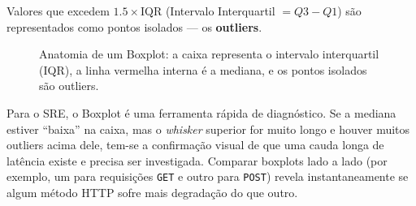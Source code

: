 \documentclass[12pt,a4paper,twoside]{report}
\begin{document}
Valores que excedem $1.5 \times \text{IQR}$ (Intervalo Interquartil $= Q3 - Q1$) são representados como pontos isolados --- os \textbf{outliers}.

\begin{figure}[h]
    \centering
    \caption{Anatomia de um Boxplot: a caixa representa o intervalo interquartil (IQR), a linha vermelha interna é a mediana, e os pontos isolados são outliers.}
\end{figure}

Para o SRE, o Boxplot é uma ferramenta rápida de diagnóstico. Se a mediana estiver ``baixa'' na caixa, mas o \textit{whisker} superior for muito longo e houver muitos outliers acima dele, tem-se a confirmação visual de que uma cauda longa de latência existe e precisa ser investigada. Comparar boxplots lado a lado (por exemplo, um para requisições \texttt{GET} e outro para \texttt{POST}) revela instantaneamente se algum método HTTP sofre mais degradação do que outro.
\end{document}
